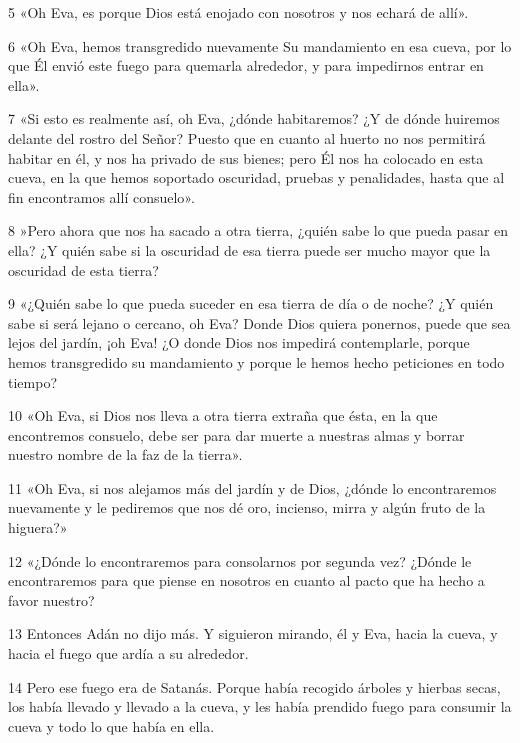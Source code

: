 \par 5 «Oh Eva, es porque Dios está enojado con nosotros y nos echará de allí».

\par 6 «Oh Eva, hemos transgredido nuevamente Su mandamiento en esa cueva, por lo que Él envió este fuego para quemarla alrededor, y para impedirnos entrar en ella».

\par 7 «Si esto es realmente así, oh Eva, ¿dónde habitaremos? ¿Y de dónde huiremos delante del rostro del Señor? Puesto que en cuanto al huerto no nos permitirá habitar en él, y nos ha privado de sus bienes; pero Él nos ha colocado en esta cueva, en la que hemos soportado oscuridad, pruebas y penalidades, hasta que al fin encontramos allí consuelo».

\par 8 »Pero ahora que nos ha sacado a otra tierra, ¿quién sabe lo que pueda pasar en ella? ¿Y quién sabe si la oscuridad de esa tierra puede ser mucho mayor que la oscuridad de esta tierra?

\par 9 «¿Quién sabe lo que pueda suceder en esa tierra de día o de noche? ¿Y quién sabe si será lejano o cercano, oh Eva? Donde Dios quiera ponernos, puede que sea lejos del jardín, ¡oh Eva! ¿O donde Dios nos impedirá contemplarle, porque hemos transgredido su mandamiento y porque le hemos hecho peticiones en todo tiempo?

\par 10 «Oh Eva, si Dios nos lleva a otra tierra extraña que ésta, en la que encontremos consuelo, debe ser para dar muerte a nuestras almas y borrar nuestro nombre de la faz de la tierra».

\par 11 «Oh Eva, si nos alejamos más del jardín y de Dios, ¿dónde lo encontraremos nuevamente y le pediremos que nos dé oro, incienso, mirra y algún fruto de la higuera?»

\par 12 «¿Dónde lo encontraremos para consolarnos por segunda vez? ¿Dónde le encontraremos para que piense en nosotros en cuanto al pacto que ha hecho a favor nuestro?

\par 13 Entonces Adán no dijo más. Y siguieron mirando, él y Eva, hacia la cueva, y hacia el fuego que ardía a su alrededor.

\par 14 Pero ese fuego era de Satanás. Porque había recogido árboles y hierbas secas, los había llevado y llevado a la cueva, y les había prendido fuego para consumir la cueva y todo lo que había en ella.

